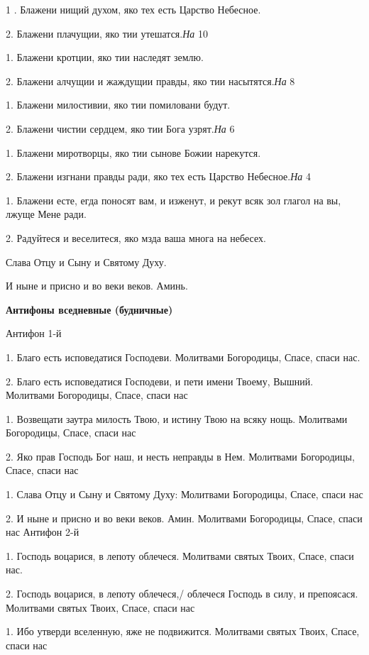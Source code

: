  1 . Блажени нищий духом, яко тех есть Царство Небесное. 

 2. Блажени плачущии, яко тии утешатся.{\itshape  На }10 

 1. Блажени кротции, яко тии наследят землю. 

 2. Блажени алчущии и жаждущии правды, яко тии насытятся.{\itshape  На} 8 

 1. Блажени милостивии, яко тии помиловани будут. 

 2. Блажени чистии сердцем, яко тии Бога узрят.{\itshape  На} 6 

 1. Блажени миротворцы, яко тии сынове Божии нарекутся. 

 2. Блажени изгнани правды ради, яко тех есть Царство Небесное.{\itshape  На} 4 

 1. Блажени есте, егда поносят вам, и изженут, и рекут всяк зол глагол на вы, лжуще Мене ради. 

 2. Радуйтеся и веселитеся, яко мзда ваша многа на небесех. 

 Слава Отцу и Сыну и Святому Духу. 

 И ныне и присно и во веки веков. Аминь.  

\medskip 

{\bfseries Антифоны вседневные (будничные) } 

Антифон 1-й 

 1. Благо есть исповедатися Господеви. Молитвами Богородицы, Спасе, спаси нас. 

 2. Благо есть исповедатися Господеви, и пети имени Твоему, Вышний. Молитвами Богородицы, Спасе, спаси нас 

 1. Возвещати заутра милость Твою, и истину Твою на всяку нощь. Молитвами Богородицы, Спасе, спаси нас 

 2. Яко прав Господь Бог наш, и несть неправды в Нем. Молитвами Богородицы, Спасе, спаси нас

 1. Слава Отцу и Сыну и Святому Духу: Молитвами Богородицы, Спасе, спаси нас 

 2. И ныне и присно и во веки веков. Амин. Молитвами Богородицы, Спасе, спаси нас  Антифон 2-й 

 1. Господь воцарися, в лепоту облечеся. Молитвами святых Твоих, Спасе, спаси нас. 

 2. Господь воцарися, в лепоту облечеся,/ облечеся Господь в силу, и препоясася. Молитвами святых Твоих, Спасе, спаси нас 

 1. Ибо утверди вселенную, яже не подвижится. Молитвами святых Твоих, Спасе, спаси нас 

